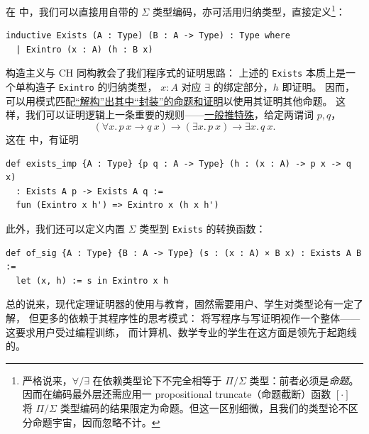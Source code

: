 在 \Tigrisd 中，我们可以直接用自带的 $\Sigma$ 类型编码，亦可活用归纳类型，直接定义\footnote{
  严格说来，$\forall/\exists$ 在依赖类型论下不完全相等于 $\Pi/\Sigma$ 类型：前者必须是\emph{命题}。
  因而在编码最外层还需应用一 propositional truncate（命题截断）函数 $[\cdot]$
  将 $\Pi/\Sigma$ 类型编码的结果限定为命题。但这一区别细微，且我们的类型论不区分命题宇宙，因而忽略不计。
}：
\begin{verbatim}
inductive Exists (A : Type) (B : A -> Type) : Type where
  | Exintro (x : A) (h : B x)
\end{verbatim}
构造主义与 CH 同构教会了我们程序式的证明思路：
上述的 \texttt{Exists} 本质上是一个单构造子 \texttt{Exintro} 的归纳类型，
$x : A$ 对应 $\exists$ 的绑定部分，$h$ 即证明。
因而，可以用模式匹配\underline{“解构”出其中“封装”的命题和证明}以使用其证明其他命题。
这样，我们可以证明逻辑上一条重要的规则——\underline{一般推特殊}，给定两谓词 $p, q$，
\begingroup\setlength{\abovedisplayskip}{3pt}\setlength{\belowdisplayskip}{3pt}
\begin{equation}
  (\forall x.\,p\ x\to q\ x)\to(\exists x.\,p\ x)\to\exists x.\,q\ x.
\end{equation}
\endgroup
这在 \Tigrisd 中，有证明
\begin{verbatim}
def exists_imp {A : Type} {p q : A -> Type} (h : (x : A) -> p x -> q x)
  : Exists A p -> Exists A q :=
  fun (Exintro x h') => Exintro x (h x h')
\end{verbatim}

此外，我们还可以定义内置 $\Sigma$ 类型到 \texttt{Exists} 的转换函数：

\begin{verbatim}
def of_sig {A : Type} {B : A -> Type} (s : (x : A) × B x) : Exists A B :=
  let (x, h) := s in Exintro x h
\end{verbatim}

总的说来，现代定理证明器的使用与教育，固然需要用户、学生对类型论有一定了解，
但更多的依赖于其程序性的思考模式：
将写程序与写证明视作一个整体——这要求用户受过编程训练，
而计算机、数学专业的学生在这方面是领先于起跑线的。

